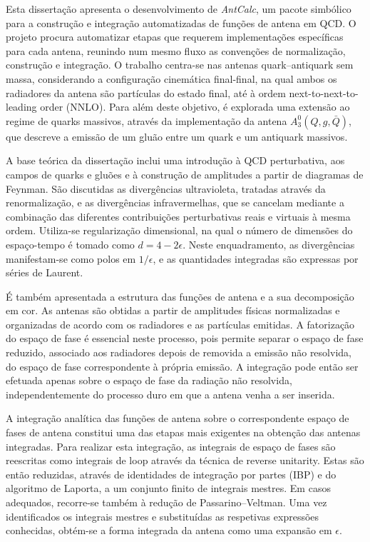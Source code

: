 Esta dissertação apresenta o desenvolvimento de \textit{AntCalc}, um pacote simbólico para a 
construção e integração automatizadas de funções de antena em QCD. O projeto 
procura automatizar etapas que requerem implementações específicas para cada antena, 
reunindo num mesmo fluxo as convenções de normalização, construção e integração. O
trabalho centra-se nas antenas
quark–antiquark sem massa, considerando a configuração cinemática final-final, na
qual ambos os radiadores da antena são partículas do estado final, até à ordem
next-to-next-to-leading order (NNLO). Para além deste objetivo, é explorada
uma extensão ao regime de quarks massivos, através da implementação da antena
\(A_3^0(Q,g,\bar{Q})\), que descreve a emissão de um gluão entre um quark e um
antiquark massivos.

A base teórica da dissertação inclui uma introdução à QCD perturbativa, aos campos de 
quarks e gluões e à construção de amplitudes a partir de diagramas de Feynman. São
discutidas as divergências ultravioleta, tratadas através da renormalização, e as
divergências infravermelhas, que se cancelam mediante a combinação das diferentes
contribuições perturbativas reais e virtuais à mesma ordem. Utiliza-se regularização
dimensional, na qual o número de dimensões
do espaço-tempo é tomado como \(d=4-2\epsilon\). Neste enquadramento, as divergências
manifestam-se como polos em \(1/\epsilon\), e as quantidades integradas são expressas por
séries de Laurent.

É também apresentada a estrutura das funções de antena e a sua decomposição em cor. 
As antenas são obtidas a partir de amplitudes físicas normalizadas e organizadas de 
acordo com os radiadores e as partículas emitidas. A fatorização do espaço de fase é 
essencial neste processo, pois permite separar o espaço de fase reduzido, associado aos radiadores depois de removida a emissão não resolvida, do espaço de fase 
correspondente à própria emissão. A integração pode então ser efetuada apenas sobre 
o espaço de fase da radiação não resolvida, independentemente do processo duro em
que a antena venha a ser inserida.

A integração analítica das funções de antena sobre o correspondente espaço de fases
de antena constitui uma das etapas mais exigentes na obtenção das antenas
integradas. Para realizar esta integração, as integrais de espaço de fases são
reescritas como integrais de loop através da técnica de reverse unitarity. Estas
são então reduzidas, através de identidades de integração por partes (IBP) e do
algoritmo de Laporta, a um conjunto finito de integrais mestres. Em casos adequados, recorre-se também à redução de
Passarino–Veltman. Uma vez identificados os integrais mestres e substituídas as 
respetivas expressões conhecidas, obtém-se a forma integrada da antena como uma 
expansão em \(\epsilon\).

